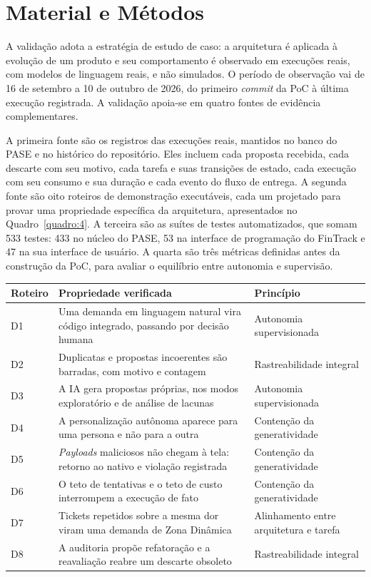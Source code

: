 \section{Material e Métodos}\label{sec:5.3}

A validação adota a estratégia de estudo de caso: a arquitetura é aplicada à evolução de um produto e seu comportamento é observado em execuções reais, com modelos de linguagem reais, e não simulados. O período de observação vai de 16 de setembro a 10 de outubro de 2026, do primeiro \textit{commit} da PoC à última execução registrada. A validação apoia-se em quatro fontes de evidência complementares.

A primeira fonte são os registros das execuções reais, mantidos no banco do PASE e no histórico do repositório. Eles incluem cada proposta recebida, cada descarte com seu motivo, cada tarefa e suas transições de estado, cada execução com seu consumo e sua duração e cada evento do fluxo de entrega. A segunda fonte são oito roteiros de demonstração executáveis, cada um projetado para provar uma propriedade específica da arquitetura, apresentados no Quadro~\ref{quadro:4}. A terceira são as suítes de testes automatizados, que somam 533 testes: 433 no núcleo do PASE, 53 na interface de programação do FinTrack e 47 na sua interface de usuário. A quarta são três métricas definidas antes da construção da PoC, para avaliar o equilíbrio entre autonomia e supervisão.

\begin{quadro}[htb]
\centering
\caption{Roteiros de demonstração e as propriedades que verificam}
\label{quadro:4}
\footnotesize
\renewcommand{\arraystretch}{1.25}
\begin{tabularx}{\textwidth}{|X|X|X|}
\hline
\textbf{Roteiro} & \textbf{Propriedade verificada} & \textbf{Princípio} \\
\hline
D1 & Uma demanda em linguagem natural vira código integrado, passando por decisão humana & Autonomia supervisionada \\
\hline
D2 & Duplicatas e propostas incoerentes são barradas, com motivo e contagem & Rastreabilidade integral \\
\hline
D3 & A IA gera propostas próprias, nos modos exploratório e de análise de lacunas & Autonomia supervisionada \\
\hline
D4 & A personalização autônoma aparece para uma persona e não para a outra & Contenção da generatividade \\
\hline
D5 & \textit{Payloads} maliciosos não chegam à tela: retorno ao nativo e violação registrada & Contenção da generatividade \\
\hline
D6 & O teto de tentativas e o teto de custo interrompem a execução de fato & Contenção da generatividade \\
\hline
D7 & Tickets repetidos sobre a mesma dor viram uma demanda de Zona Dinâmica & Alinhamento entre arquitetura e tarefa \\
\hline
D8 & A auditoria propõe refatoração e a reavaliação reabre um descarte obsoleto & Rastreabilidade integral \\
\hline
\end{tabularx}
\end{quadro}

